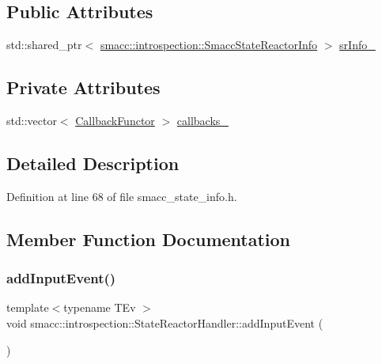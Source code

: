 \subsection*{Public Attributes}
\begin{DoxyCompactItemize}
\item 
std\+::shared\+\_\+ptr$<$ \hyperlink{structsmacc_1_1introspection_1_1SmaccStateReactorInfo}{smacc\+::introspection\+::\+Smacc\+State\+Reactor\+Info} $>$ \hyperlink{classsmacc_1_1introspection_1_1StateReactorHandler_a30bb48cbd4712aff2683c21b85ef3e8e}{sr\+Info\+\_\+}
\end{DoxyCompactItemize}
\subsection*{Private Attributes}
\begin{DoxyCompactItemize}
\item 
std\+::vector$<$ \hyperlink{structsmacc_1_1introspection_1_1CallbackFunctor}{Callback\+Functor} $>$ \hyperlink{classsmacc_1_1introspection_1_1StateReactorHandler_a36afd8fbef7a62112c3a7c81ed364876}{callbacks\+\_\+}
\end{DoxyCompactItemize}


\subsection{Detailed Description}


Definition at line 68 of file smacc\+\_\+state\+\_\+info.\+h.



\subsection{Member Function Documentation}
\mbox{\label{classsmacc_1_1introspection_1_1StateReactorHandler_aef392b9521dc4484ef84082844cd3538}} 
\subsubsection{\texorpdfstring{add\+Input\+Event()}{addInputEvent()}}
{\footnotesize\ttfamily template$<$typename T\+Ev $>$ \\
void smacc\+::introspection\+::\+State\+Reactor\+Handler\+::add\+Input\+Event (\begin{DoxyParamCaption}{ }\end{DoxyParamCaption})}



